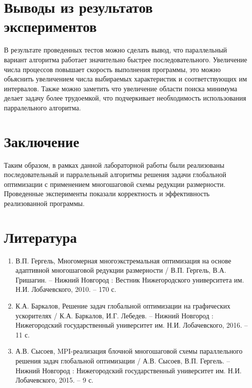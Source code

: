 \documentclass{report}
\begin{document}
\section*{Выводы из результатов экспериментов }
В результате проведенных тестов можно сделать вывод, что параллельный вариант алгоритма работает значительно быстрее последовательного. Увеличение числа процессов повышает скорость выполнения программы, это можно обьяснить увеличением числа выбираемых характеристик и соответствующих им интервалов.
Также можно заметить что увеличение области поиска минимума делает задачу более трудоемкой, что подчеркивает необходимость использования парралельного алгоритма.

\section*{Заключение}
Таким образом, в рамках данной лабораторной работы были реализованы последовательный и парралельный алгоритмы решения задачи глобальной оптимизации с применением многошаговой схемы редукции размерности. Проведенные эксперименты показали корректность и эффективность реализованной программы.
\newpage


\section*{Литература}
\begin{enumerate}
\item В.П. Гергель,  Многомерная многоэкстремальная оптимизация на основе адаптивной многошаговой редукции размерности /  В.П. Гергель,  В.А. Гришагин. – Нижний Новгород : Вестник Нижегородского университета им. Н.И. Лобачевского, 2010. – 170 с.
\item К.А. Баркалов,  Решение задач глобальной оптимизации на графических ускорителях /  К.А. Баркалов,  И.Г. Лебедев. – Нижний Новгород : Нижегородский государственный университет им. Н.И. Лобачевского, 2016. – 11 с.
\item А.В. Сысоев,  MPI-реализация блочной многошаговой схемы параллельного решения задач глобальной оптимизации /  А.В. Сысоев,  В.П. Гергель. – Нижний Новгород : Нижегородский государственный университет им. Н.И. Лобачевского, 2015. – 9 с.
\end{enumerate} 
\newpage
\end{document}
